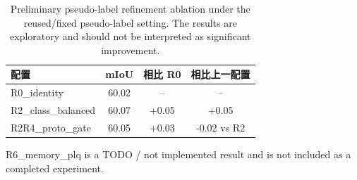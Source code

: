 \begin{table}[t]
  \centering
  \caption{Preliminary pseudo-label refinement ablation under the reused/fixed pseudo-label setting. The results are exploratory and should not be interpreted as significant improvement.}
  \label{tab:pseudo_label_ablation}
  \begin{tabular}{lccc}
    \toprule
    配置 & mIoU & 相比 R0 & 相比上一配置 \\
    \midrule
    R0\_identity & 60.02 & -- & -- \\
    R2\_class\_balanced & 60.07 & +0.05 & +0.05 \\
    R2R4\_proto\_gate & 60.05 & +0.03 & -0.02 vs R2 \\
    \bottomrule
  \end{tabular}

  \vspace{0.5em}
  \footnotesize{R6\_memory\_plq is a TODO / not implemented result and is not included as a completed experiment.}
\end{table}
